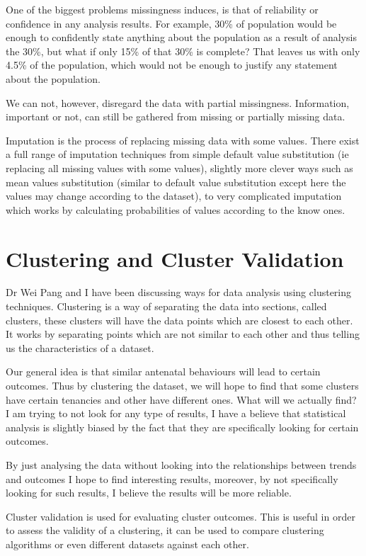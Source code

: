 \documentclass[bsc]{abdnthesis}
\begin{document}
One of the biggest problems missingness induces, is that of reliability or confidence in any analysis results. For example, 30\% of population would be enough to confidently state anything about the population as a result of analysis the 30\%, but what if only 15\% of that 30\% is complete? That leaves us with only 4.5\% of the population, which would not be enough to justify any statement about the population. 

We can not, however, disregard the data with partial missingness. Information, important or not, can still be gathered from missing or partially missing data. 

Imputation is the process of replacing missing data with some values. There exist a full range of imputation techniques from simple default value substitution (ie replacing all missing values with some values), slightly more clever ways such as mean values substitution (similar to default value substitution except here the values may change according to the dataset), to very complicated imputation which works by calculating probabilities of values according to the know ones. 
\section{Clustering and Cluster Validation} %
\label{sec:clustering_and_cluster_validation}
Dr Wei Pang and I have been discussing ways for data analysis using clustering techniques. Clustering is a way of separating the data into sections, called clusters, these clusters will have the data points which are closest to each other. It works by separating points which are not similar to each other and thus telling us the characteristics of a dataset. 

Our general idea is that similar antenatal behaviours will lead to certain outcomes. Thus by clustering the dataset, we will hope to find that some clusters have certain tenancies and other have different ones. What will we actually find? I am trying to not look for any type of results, I have a believe that statistical analysis is slightly biased by the fact that they are specifically looking for certain outcomes.

By just analysing the data without looking into the relationships between trends and outcomes I hope to find interesting results, moreover, by not specifically looking for such results, I believe the results will be more reliable. 

Cluster validation is used for evaluating cluster outcomes. This is useful in order to assess the validity of a clustering, it can be used to compare clustering algorithms or even different datasets against each other. 
\end{document}
